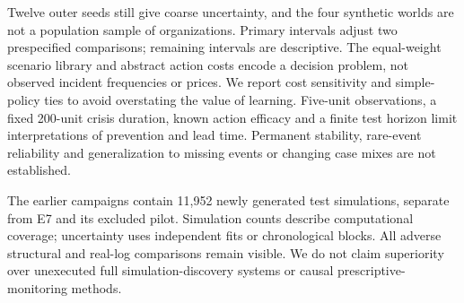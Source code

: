 \documentclass[runningheads]{llncs}
\begin{document}
Twelve outer seeds still give coarse uncertainty, and the four synthetic worlds are not a population sample of organizations. Primary intervals adjust two prespecified comparisons; remaining intervals are descriptive. The equal-weight scenario library and abstract action costs encode a decision problem, not observed incident frequencies or prices. We report cost sensitivity and simple-policy ties to avoid overstating the value of learning. Five-unit observations, a fixed 200-unit crisis duration, known action efficacy and a finite test horizon limit interpretations of prevention and lead time. Permanent stability, rare-event reliability and generalization to missing events or changing case mixes are not established.

The earlier campaigns contain 11,952 newly generated test simulations, separate from E7 and its excluded pilot. Simulation counts describe computational coverage; uncertainty uses independent fits or chronological blocks. All adverse structural and real-log comparisons remain visible. We do not claim superiority over unexecuted full simulation-discovery systems or causal prescriptive-monitoring methods.





\label{maintextend}


\end{document}
